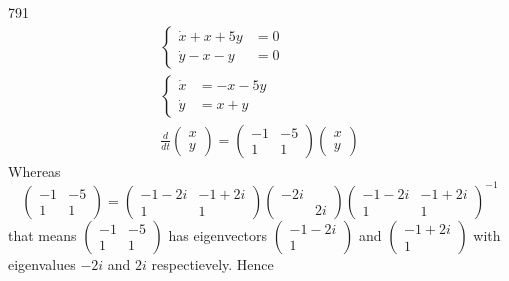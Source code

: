 \documentclass[12pt,a4paper]{article}
\begin{document}
    \begin{problem}{791}
        \begin{gather*}
            \left\{
                \begin{aligned}
                    \dot{x} + x + 5y &= 0\\
                    \dot{y} - x - y &= 0
                \end{aligned}
            \right.\\
            \left\{
                \begin{aligned}
                    \dot{x} &= -x - 5y\\
                    \dot{y} &= x + y
                \end{aligned}
            \right.\\
            \frac{d}{dt}
            \begin{pmatrix}
                x\\
                y
            \end{pmatrix}
            =
            \begin{pmatrix}
                -1& -5\\
                1& 1
            \end{pmatrix}
            \begin{pmatrix}
                x\\
                y
            \end{pmatrix}
        \end{gather*}
        Whereas
        \[
            \begin{pmatrix}
                -1& -5\\
                1& 1
            \end{pmatrix}
            =
            \begin{pmatrix}
                -1-2i& -1+2i\\
                1& 1
            \end{pmatrix}
            \begin{pmatrix}
                -2i&\\
                &2i
            \end{pmatrix}
            \begin{pmatrix}
                -1-2i& -1+2i\\
                1& 1
            \end{pmatrix}^{-1}
        \]
        that means $(\begin{smallmatrix}-1& -5\\1& 1\end{smallmatrix})$ has eigenvectors $(\begin{smallmatrix}-1-2i\\1\end{smallmatrix})$ and $(\begin{smallmatrix}-1+2i\\1\end{smallmatrix})$ with eigenvalues $-2i$ and $2i$ respectievely. Hence

\end{problem}
\end{document}
